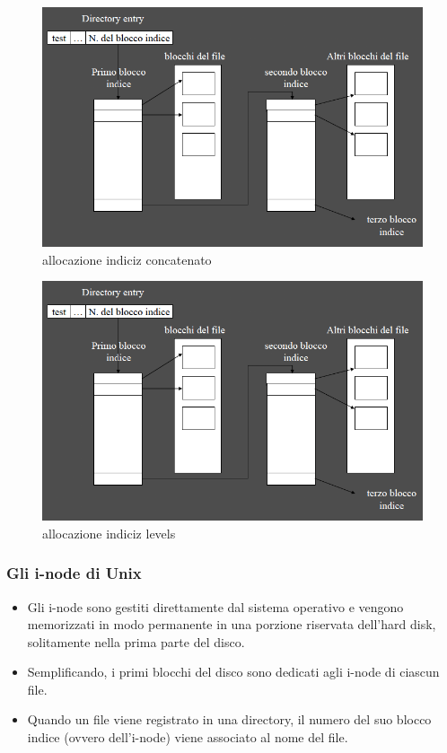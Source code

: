 \begin{figure}[h] \centering \includegraphics[width=0.50\linewidth]{images/allocazione_indiciz_concatenato.png} \caption{allocazione indiciz concatenato} \label{fig:14.4a} \end{figure}
\begin{figure}[h] \centering \includegraphics[width=0.50\linewidth]{images/allocazione_indiciz_levels.png} \caption{allocazione indiciz levels} \label{fig:14.4b} \end{figure}
\subsubsection{Gli i-node di Unix}
\begin{itemize}
    \item Gli i-node sono gestiti direttamente dal sistema operativo e vengono memorizzati in modo permanente in una porzione riservata dell’hard disk, solitamente nella prima parte del disco.
    \item Semplificando, i primi blocchi del disco sono dedicati agli i-node di ciascun file.
    \item Quando un file viene registrato in una directory, il numero del suo blocco indice (ovvero dell’i-node) viene associato al nome del file.
\end{itemize}

